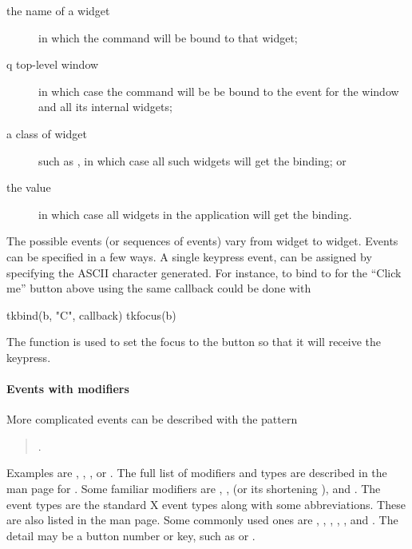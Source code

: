 \begin{description}
\item[the name of a widget] in which the command will be bound to that widget;
\item[q top-level window] in which case the command will be be bound to the event for the window and all its internal widgets;

\item[a class of widget] such as , in which case all such widgets will get the binding; or 
\item[the value ] in which case all widgets in the application will get the binding.
\end{description}
The possible events (or sequences of events) vary from widget to widget. Events can be specified in a few ways. A single keypress event, can be assigned by specifying the ASCII character generated. For instance, to bind to   for the ``Click me'' button above using the same callback could be done with
\begin{Schunk}
\begin{Sinput}
  tkbind(b, "C", callback)
  tkfocus(b)
\end{Sinput}
\end{Schunk}
The  function is used to set the focus to the button so that it will receive the keypress.

\paragraph{Events with modifiers}
More complicated events can be described with the pattern 

\begin{quotation}
.   
\end{quotation}

Examples are ,  , ,  or .
The full list of modifiers and types are described in the man page for . Some familiar modifiers are , ,  (or its shortening ),  and . The event types are the standard X event types along with some abbreviations. These are also listed in the  man page. Some commonly used ones are , , , , , and . The detail may be a button number or key, such as  or .

